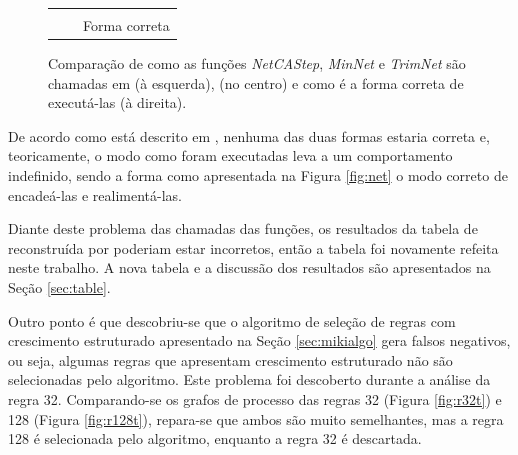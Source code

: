 \documentclass[12pt,a4paper]{article}
\begin{document}
\begin{figure}
\begin{center}
\begin{tabular}{c c c}
\begin{tikzpicture}[node distance = 4cm, auto, scale=0.55, transform shape]

\end{tikzpicture} &
\begin{tikzpicture}[node distance = 4cm, auto, scale=0.55, transform shape]

\end{tikzpicture} &
\begin{tikzpicture}[node distance=6cm, auto, scale=0.5, transform shape]

\end{tikzpicture} \\
\citeonline{trafaniuc2004} & \citeonline{miki2006} & Forma correta \\
\end{tabular}
\caption[Comparação de encadeamento das funções \emph{NetCAStep}, \emph{MinNet} e \emph{TrimNet}]
{Comparação de como as funções \emph{NetCAStep}, \emph{MinNet} e \emph{TrimNet} são
    chamadas em  (à esquerda),  (no centro) e como é a forma correta de
executá-las (à direita).}
\label{fig:net-miki}
\end{center}
\end{figure}

De acordo como está descrito em
, nenhuma das duas formas estaria correta e,
teoricamente, o modo como foram executadas leva a um comportamento indefinido,
sendo a forma como apresentada na Figura \ref{fig:net} o modo correto de
encadeá-las e realimentá-las.

Diante deste problema das chamadas das funções, os resultados da tabela de
 reconstruída por  poderiam
estar incorretos, então a tabela foi novamente refeita neste trabalho. A nova tabela e a
discussão dos resultados são apresentados na Seção \ref{sec:table}.

Outro ponto é que descobriu-se que o algoritmo de seleção de regras com
crescimento estruturado apresentado na Seção \ref{sec:mikialgo} gera falsos
negativos, ou seja, algumas regras que apresentam crescimento estruturado
não são selecionadas pelo algoritmo. Este problema foi descoberto durante
a análise da regra 32. Comparando-se os grafos de processo das regras
32 (Figura \ref{fig:r32t}) e 128 (Figura \ref{fig:r128t}), repara-se que
ambos são muito semelhantes, mas a regra 128 é selecionada pelo algoritmo,
enquanto a regra 32 é descartada.
\end{document}
